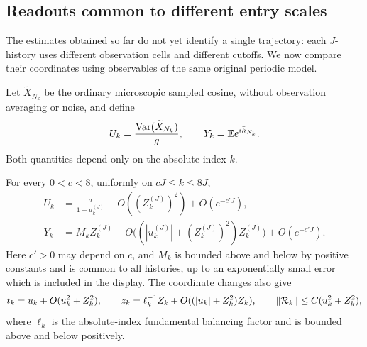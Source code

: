 \subsection{Readouts common to different entry scales}

The estimates obtained so far do not yet identify a single
trajectory: each $J$-history uses different observation cells and
different cutoffs.  We now compare their coordinates using
observables of the same original periodic model.

Let $\widetilde X_{N_k}$ be the ordinary microscopic sampled cosine,
without observation averaging or noise, and define
\begin{equation}\label{eq:bulk-common-observables}
 U_k=\frac{\operatorname{Var}(\widetilde X_{N_k})}{g},
 \qquad Y_k=\mathbb E e^{i\bar h_{N_k}}.
\end{equation}
Both quantities depend only on the absolute index $k$.

\begin{proposition}
\label{prop:bulk-readouts}
For every $0<c<8$, uniformly on $cJ\le k\le8J$,
\begin{align}
 U_k&=\frac{a}{1-u_k^{(J)}}+O((Z_k^{(J)})^2)+O(e^{-c'J}),
 \label{eq:bulk-U-readout}\\
 Y_k&=M_kZ_k^{(J)}
 +O\bigl((|u_k^{(J)}|+(Z_k^{(J)})^2)Z_k^{(J)}\bigr)
 +O(e^{-c'J}).
 \label{eq:bulk-Y-readout}
\end{align}
Here $c'>0$ may depend on $c$, and $M_k$ is bounded above and
below by positive constants and is common to all histories,
up to an exponentially small error which is included in the
display.  The coordinate changes also give
\begin{equation}\label{eq:bulk-coordinate-conversion}
 t_k=u_k+O(u_k^2+Z_k^2),\qquad
 z_k=\ell_k^{-1}Z_k+O((|u_k|+Z_k^2)Z_k),\qquad
 \lVert\mathcal R_k\rVert\le C(u_k^2+Z_k^2),
\end{equation}
where $\ell_k$ is the absolute-index fundamental balancing
factor and is bounded above and below positively.
\end{proposition}

